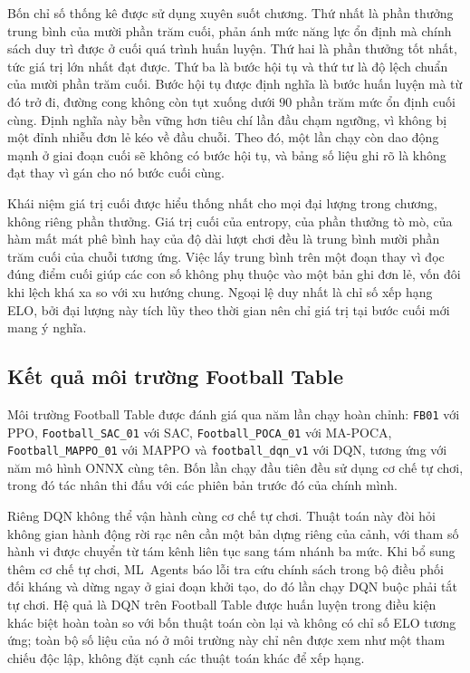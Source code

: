 \indent Bốn chỉ số thống kê được sử dụng xuyên suốt chương. Thứ nhất là phần thưởng trung
bình của mười phần trăm cuối, phản ánh mức năng lực ổn định mà chính sách duy trì được ở
cuối quá trình huấn luyện. Thứ hai là phần thưởng tốt nhất, tức giá trị lớn nhất đạt được.
Thứ ba là bước hội tụ và thứ tư là độ lệch chuẩn của mười phần trăm cuối. Bước hội tụ được
định nghĩa là bước huấn luyện mà từ đó trở đi, đường cong không còn tụt xuống dưới $90$
phần trăm mức ổn định cuối cùng. Định nghĩa này bền vững hơn tiêu chí lần đầu chạm ngưỡng,
vì không bị một đỉnh nhiễu đơn lẻ kéo về đầu chuỗi. Theo đó, một lần chạy còn dao động
mạnh ở giai đoạn cuối sẽ không có bước hội tụ, và bảng số liệu ghi rõ là không đạt thay vì
gán cho nó bước cuối cùng.

\indent Khái niệm giá trị cuối được hiểu thống nhất cho mọi đại lượng trong chương, không
riêng phần thưởng. Giá trị cuối của entropy, của phần thưởng tò mò, của hàm mất mát phê
bình hay của độ dài lượt chơi đều là trung bình mười phần trăm cuối của chuỗi tương ứng.
Việc lấy trung bình trên một đoạn thay vì đọc đúng điểm cuối giúp các con số không phụ
thuộc vào một bản ghi đơn lẻ, vốn đôi khi lệch khá xa so với xu hướng chung. Ngoại lệ duy
nhất là chỉ số xếp hạng ELO, bởi đại lượng này tích lũy theo thời gian nên chỉ giá trị tại
bước cuối mới mang ý nghĩa.

\subsection{Kết quả môi trường Football Table}

{\sloppy
\indent Môi trường Football Table được đánh giá qua năm lần chạy hoàn chỉnh: \texttt{FB01}
với PPO, \texttt{Football\_SAC\_01} với SAC, \texttt{Football\_POCA\_01} với MA-POCA,
\texttt{Football\_MAPPO\_01} với MAPPO và \texttt{football\_dqn\_v1} với DQN, tương ứng
với năm mô hình ONNX cùng tên. Bốn lần chạy đầu tiên đều sử dụng cơ chế tự chơi, trong đó
tác nhân thi đấu với các phiên bản trước đó của chính mình.\par}

\indent Riêng DQN không thể vận hành cùng cơ chế tự chơi. Thuật toán này đòi hỏi không
gian hành động rời rạc nên cần một bản dựng riêng của cảnh, với tham số hành vi được
chuyển từ tám kênh liên tục sang tám nhánh ba mức. Khi bổ sung thêm cơ chế tự chơi,
ML~Agents báo lỗi tra cứu chính sách trong bộ điều phối đối kháng và dừng ngay ở giai đoạn
khởi tạo, do đó lần chạy DQN buộc phải tắt tự chơi. Hệ quả là DQN trên Football Table được
huấn luyện trong điều kiện khác biệt hoàn toàn so với bốn thuật toán còn lại và không có
chỉ số ELO tương ứng; toàn bộ số liệu của nó ở môi trường này chỉ nên được xem như một
tham chiếu độc lập, không đặt cạnh các thuật toán khác để xếp hạng.


